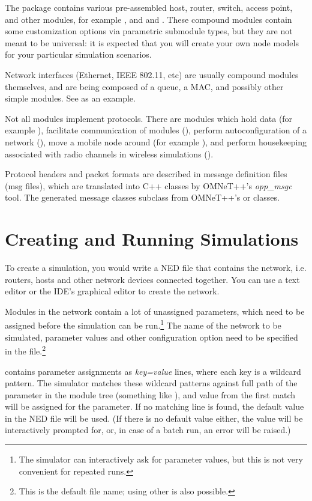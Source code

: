 The  package contains various pre-assembled host, router,
switch, access point, and other modules, for example
,  and  and
. These compound modules contain some customization
options via parametric submodule types, but they are not meant to be
universal: it is expected that you will create your own node models for
your particular simulation scenarios.

Network interfaces (Ethernet, IEEE 802.11, etc) are usually compound modules
themselves, and are being composed of a queue, a MAC, and possibly other
simple modules. See  as an example.

Not all modules implement protocols. There are modules which hold data (for
example ), facilitate communication of modules
(), perform autoconfiguration of a network
(), move a mobile node around (for example
), and perform housekeeping associated with
radio channels in wireless simulations ().

Protocol headers and packet formats are described in message definition
files (msg files), which are translated into C++ classes by OMNeT++'s
\textit{opp\_msgc} tool. The generated message classes subclass from OMNeT++'s
 or  classes.


\section{Creating and Running Simulations}

To create a simulation, you would write a NED file that contains the network,
i.e. routers, hosts and other network devices connected together. You can
use a text editor or the IDE's graphical editor to create the network.

Modules in the network contain a lot of unassigned parameters, which need
to be assigned before the simulation can be run.\footnote{The simulator can
interactively ask for parameter values, but this is not very convenient
for repeated runs.} The name of the network to be simulated, parameter values
and other configuration option need to be specified in the 
file.\footnote{This is the default file name; using other is also possible.}

 contains parameter assignments as \textit{key=value}
lines, where each key is a wildcard pattern. The simulator matches these
wildcard patterns against full path of the parameter in the module tree
(something like ), and value from
the first match will be assigned for the parameter. If no matching line is
found, the default value in the NED file will be used. (If there is no
default value either, the value will be interactively prompted for, or, in
case of a batch run, an error will be raised.)

